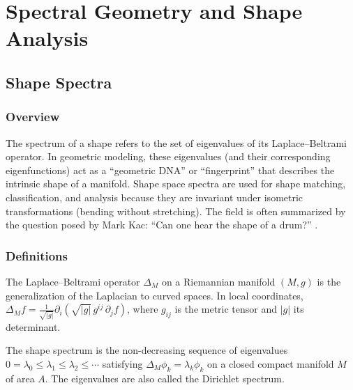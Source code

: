 \chapter{Spectral Geometry and Shape Analysis}
\label{ch:spectral_geometry}

\section{Shape Spectra}
\label{sec:shape_spectra}

\subsection{Overview}
The spectrum of a shape refers to the set of eigenvalues of its Laplace--Beltrami operator. In geometric modeling, these eigenvalues (and their corresponding eigenfunctions) act as a ``geometric DNA'' or ``fingerprint'' that describes the intrinsic shape of a manifold. Shape space spectra are used for shape matching, classification, and analysis because they are invariant under isometric transformations (bending without stretching). The field is often summarized by the question posed by Mark Kac: ``Can one hear the shape of a drum?'' \cite{kac1966}.

\subsection{Definitions}
\begin{definition}\label{def:laplace_beltrami}
The Laplace--Beltrami operator $\Delta_M$ on a Riemannian manifold $(M, g)$ is the generalization of the Laplacian to curved spaces. In local coordinates, $\Delta_M f = \frac{1}{\sqrt{|g|}} \partial_i \left( \sqrt{|g|} \, g^{ij} \, \partial_j f \right)$, where $g_{ij}$ is the metric tensor and $|g|$ its determinant.
\end{definition}

\begin{definition}\label{def:shape_spectrum}
The shape spectrum is the non-decreasing sequence of eigenvalues $0 = \lambda_0 \le \lambda_1 \le \lambda_2 \le \cdots$ satisfying $\Delta_M \phi_k = \lambda_k \phi_k$ on a closed compact manifold $M$ of area $A$. The eigenvalues are also called the Dirichlet spectrum.
\end{definition}

